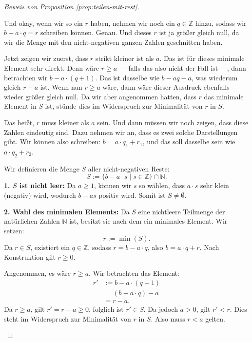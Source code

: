 \begin{proof}[Beweis von Proposition \ref{prop:teilen-mit-rest}]
\begin{spoken-clean}[00:08:30 - 00:11:00]
Und okay, wenn wir so ein $r$ haben, nehmen wir noch ein $q \in \mathbb{Z}$ hinzu, sodass wir $b - a \cdot q = r$ schreiben können. Genau. Und dieses $r$ ist ja größer gleich null, da wir die Menge mit den nicht-negativen ganzen Zahlen geschnitten haben.

Jetzt zeigen wir zuerst, dass $r$ strikt kleiner ist als $a$. Das ist für dieses minimale Element sehr direkt. Denn wäre $r \ge a$ --- falls das also nicht der Fall ist ---, dann betrachten wir $b - a \cdot (q + 1)$. Das ist dasselbe wie $b - aq - a$, was wiederum gleich $r - a$ ist. Wenn nun $r \ge a$ wäre, dann wäre dieser Ausdruck ebenfalls wieder größer gleich null. Da wir aber angenommen hatten, dass $r$ das minimale Element in $S$ ist, stünde dies im Widerspruch zur Minimalität von $r$ in $S$.

Das heißt, $r$ muss kleiner als $a$ sein. Und dann müssen wir noch zeigen, dass diese Zahlen eindeutig sind. Dazu nehmen wir an, dass es zwei solche Darstellungen gibt. Wir können also schreiben: $b = a \cdot q_1 + r_1$, und das soll dasselbe sein wie $a \cdot q_2 + r_2$.
\end{spoken-clean}

\begin{math-stroke}
\begin{short-proof}
Wir definieren die Menge $S$ aller nicht-negativen Reste:
\[
S := \{ b - a \cdot s \mid s \in \mathbb{Z} \} \cap \mathbb{N}.
\]
\textbf{1. $S$ ist nicht leer:} 
Da $a \ge 1$, können wir $s$ so wählen, dass $a \cdot s$ sehr klein (negativ) wird, wodurch $b - as$ positiv wird. Somit ist $S \neq \emptyset$.

\textbf{2. Wahl des minimalen Elements:}
Da $S$ eine nichtleere Teilmenge der natürlichen Zahlen $\mathbb{N}$ ist, besitzt sie nach dem  ein minimales Element. Wir setzen:
\[
r := \min(S).
\]
Da $r \in S$, existiert ein $q \in \mathbb{Z}$, sodass $r = b - a \cdot q$, also $b = a \cdot q + r$. Nach Konstruktion gilt $r \ge 0$.
\end{short-proof}

\begin{short-proof}
Angenommen, es wäre $r \ge a$. Wir betrachten das Element:
\begin{align*}
r' &:= b - a \cdot (q + 1) \\
&= (b - a \cdot q) - a \\
&= r - a.
\end{align*}
Da $r \ge a$, gilt $r' = r - a \ge 0$, folglich ist $r' \in S$. Da jedoch $a > 0$, gilt $r' < r$. Dies steht im Widerspruch zur Minimalität von $r$ in $S$. Also muss $r < a$ gelten.
\end{short-proof}
\end{math-stroke}


\end{proof}
